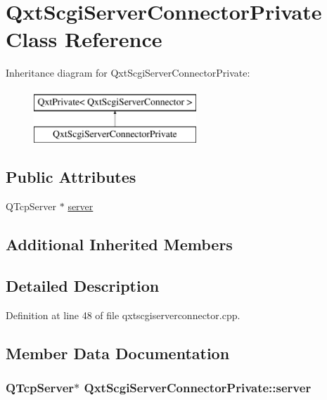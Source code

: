 \hypertarget{class_qxt_scgi_server_connector_private}{\section{Qxt\-Scgi\-Server\-Connector\-Private Class Reference}
\label{class_qxt_scgi_server_connector_private}
}
Inheritance diagram for Qxt\-Scgi\-Server\-Connector\-Private\-:\begin{figure}[H]
\begin{center}
\leavevmode
\includegraphics[height=2.000000cm]{class_qxt_scgi_server_connector_private}
\end{center}
\end{figure}
\subsection*{Public Attributes}
\begin{DoxyCompactItemize}
\item 
Q\-Tcp\-Server $\ast$ \hyperlink{class_qxt_scgi_server_connector_private_a9c4dbf5416fad10646d85de070bbe644}{server}
\end{DoxyCompactItemize}
\subsection*{Additional Inherited Members}


\subsection{Detailed Description}


Definition at line 48 of file qxtscgiserverconnector.\-cpp.



\subsection{Member Data Documentation}
\hypertarget{class_qxt_scgi_server_connector_private_a9c4dbf5416fad10646d85de070bbe644}{
\subsubsection[{server}]{\setlength{\rightskip}{0pt plus 5cm}Q\-Tcp\-Server$\ast$ Qxt\-Scgi\-Server\-Connector\-Private\-::server}}\label{class_qxt_scgi_server_connector_private_a9c4dbf5416fad10646d85de070bbe644}


